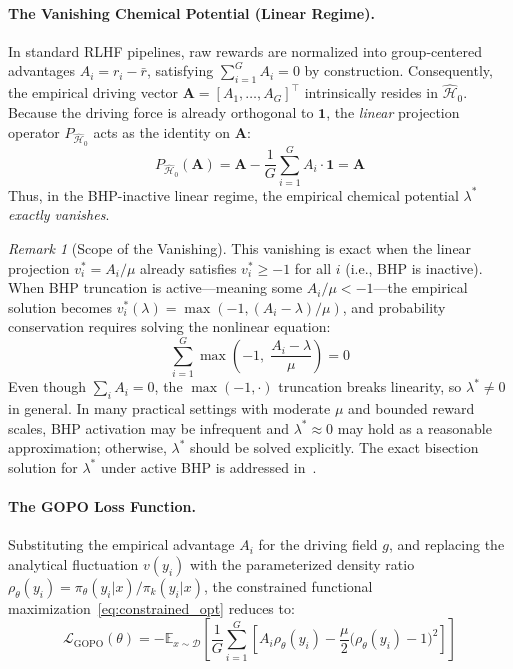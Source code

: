 \documentclass[11pt]{article}
\theoremstyle{definition}
\theoremstyle{remark}
\newtheorem{remark}[theorem]{Remark}
\newcommand{\E}{\mathbb{E}}
\newcommand{\loss}{\mathcal{L}}
\newcommand{\pik}{\pi_k}
\begin{document}
\paragraph{The Vanishing Chemical Potential (Linear Regime).}
In standard RLHF pipelines, raw rewards are normalized into group-centered advantages $A_i = r_i - \bar{r}$, satisfying $\sum_{i=1}^G A_i = 0$ by construction. Consequently, the empirical driving vector $\bm{A} = [A_1, \ldots, A_G]^\top$ intrinsically resides in $\hat{\mathcal{H}}_0$. Because the driving force is already orthogonal to $\mathbf{1}$, the \emph{linear} projection operator $P_{\hat{\mathcal{H}}_0}$ acts as the identity on $\bm{A}$:
\begin{equation}
\label{eq:vanishing_mu}
    P_{\hat{\mathcal{H}}_0}(\bm{A}) = \bm{A} - \frac{1}{G}\sum_{i=1}^G A_i \cdot \mathbf{1} = \bm{A}
\end{equation}
Thus, in the BHP-inactive linear regime, the empirical chemical potential $\lambda^*$ \emph{exactly vanishes}.

\begin{remark}[Scope of the Vanishing]
\label{rem:scope_vanishing}
This vanishing is exact when the linear projection $v_i^* = A_i/\mu$ already satisfies $v_i^* \geq -1$ for all $i$ (i.e., BHP is inactive). When BHP truncation is active---meaning some $A_i/\mu < -1$---the empirical solution becomes $v_i^*(\lambda) = \max(-1, (A_i - \lambda)/\mu)$, and probability conservation requires solving the nonlinear equation:
\begin{equation}
\label{eq:bhp_root}
    \sum_{i=1}^G \max\!\left(-1, \; \frac{A_i - \lambda}{\mu}\right) = 0
\end{equation}
Even though $\sum_i A_i = 0$, the $\max(-1, \cdot)$ truncation breaks linearity, so $\lambda^* \neq 0$ in general. In many practical settings with moderate $\mu$ and bounded reward scales, BHP activation may be infrequent and $\lambda^* \approx 0$ may hold as a reasonable approximation; otherwise, $\lambda^*$ should be solved explicitly. The exact bisection solution for $\lambda^*$ under active BHP is addressed in~\cite{Wang2025WGOPO}.
\end{remark}

\paragraph{The GOPO Loss Function.}
Substituting the empirical advantage $A_i$ for the driving field $g$, and replacing the analytical fluctuation $v(y_i)$ with the parameterized density ratio $\rho_\theta(y_i) = \pi_\theta(y_i|x)/\pik(y_i|x)$, the constrained functional maximization~\eqref{eq:constrained_opt} reduces to:
\begin{equation}
\label{eq:gopo_loss}
\boxed{
    \loss_{\text{GOPO}}(\theta) = -\E_{x \sim \mathcal{D}} \left[ \frac{1}{G}\sum_{i=1}^G \left[ A_i \rho_\theta(y_i) - \frac{\mu}{2}\big(\rho_\theta(y_i) - 1\big)^2 \right] \right]
}
\end{equation}
\end{document}

